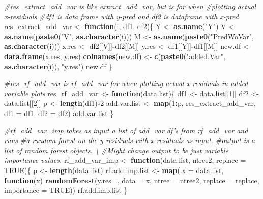 \documentclass[12pt,twoside]{reedthesis}
\newenvironment{Shaded}{\begin{snugshade}}{\end{snugshade}}
\newcommand{\KeywordTok}[1]{\textcolor[rgb]{0.13,0.29,0.53}{\textbf{#1}}}
\newcommand{\DataTypeTok}[1]{\textcolor[rgb]{0.13,0.29,0.53}{#1}}
\newcommand{\DecValTok}[1]{\textcolor[rgb]{0.00,0.00,0.81}{#1}}
\newcommand{\StringTok}[1]{\textcolor[rgb]{0.31,0.60,0.02}{#1}}
\newcommand{\CommentTok}[1]{\textcolor[rgb]{0.56,0.35,0.01}{\textit{#1}}}
\newcommand{\OtherTok}[1]{\textcolor[rgb]{0.56,0.35,0.01}{#1}}
\newcommand{\ControlFlowTok}[1]{\textcolor[rgb]{0.13,0.29,0.53}{\textbf{#1}}}
\newcommand{\OperatorTok}[1]{\textcolor[rgb]{0.81,0.36,0.00}{\textbf{#1}}}
\newcommand{\NormalTok}[1]{#1}
\theoremstyle{definition}
\theoremstyle{definition}
\theoremstyle{definition}
\theoremstyle{remark}
\begin{document}
\begin{Shaded}
\begin{Highlighting}[]
\CommentTok{#res_extract_add_var is like extract_add_var, but is for when }
\CommentTok{#plotting actual x-residuals}
\CommentTok{#df1 is data frame with y-pred and df2 is dataframe with x-pred}
\NormalTok{res_extract_add_var <-}\StringTok{ }\ControlFlowTok{function}\NormalTok{(i, df1, df2)\{}
\NormalTok{  Y <-}\StringTok{ }\KeywordTok{as.name}\NormalTok{(}\StringTok{"Y"}\NormalTok{)}
\NormalTok{  V <-}\StringTok{ }\KeywordTok{as.name}\NormalTok{(}\KeywordTok{paste0}\NormalTok{(}\StringTok{"V"}\NormalTok{, }\KeywordTok{as.character}\NormalTok{(i)))}
\NormalTok{  M <-}\StringTok{ }\KeywordTok{as.name}\NormalTok{(}\KeywordTok{paste0}\NormalTok{(}\StringTok{"PredWoVar"}\NormalTok{, }\KeywordTok{as.character}\NormalTok{(i)))}
\NormalTok{  x.res <-}\StringTok{ }\NormalTok{df2[[V]]}\OperatorTok{-}\NormalTok{df2[[M]]}
\NormalTok{  y.res <-}\StringTok{ }\NormalTok{df1[[Y]]}\OperatorTok{-}\NormalTok{df1[[M]]}
\NormalTok{  new.df <-}\StringTok{ }\KeywordTok{data.frame}\NormalTok{(x.res, y.res)}
  \KeywordTok{colnames}\NormalTok{(new.df) <-}\StringTok{ }\KeywordTok{c}\NormalTok{(}\KeywordTok{paste0}\NormalTok{(}\StringTok{"added.Var"}\NormalTok{, }\KeywordTok{as.character}\NormalTok{(i)), }\StringTok{"y.res"}\NormalTok{)}
\NormalTok{  new.df}
\NormalTok{\}}

\CommentTok{#res_rf_add_var is rf_add_var for when plotting actual x-residuals in added variable plots}
\NormalTok{res_rf_add_var <-}\StringTok{ }\ControlFlowTok{function}\NormalTok{(data.list)\{}
\NormalTok{ df1 <-}\StringTok{ }\NormalTok{data.list[[}\DecValTok{1}\NormalTok{]]}
\NormalTok{ df2 <-}\StringTok{ }\NormalTok{data.list[[}\DecValTok{2}\NormalTok{]]}
\NormalTok{ p <-}\StringTok{ }\KeywordTok{length}\NormalTok{(df1)}\OperatorTok{-}\DecValTok{2}
\NormalTok{ add.var.list <-}\StringTok{ }\KeywordTok{map}\NormalTok{(}\DecValTok{1}\OperatorTok{:}\NormalTok{p, res_extract_add_var, }\DataTypeTok{df1 =}\NormalTok{ df1, }\DataTypeTok{df2 =}\NormalTok{ df2)}
\NormalTok{ add.var.list}
\NormalTok{\}}

\CommentTok{#rf_add_var_imp takes as input a list of add_var df's from rf_add_var and runs}
\CommentTok{#a random forest on the y-residuals with x-residuals as input.}
\CommentTok{#output is a list of random forest objects. \textbackslash{}}
\CommentTok{#Might change output to be just variable importance values. }
\NormalTok{rf_add_var_imp <-}\StringTok{ }\ControlFlowTok{function}\NormalTok{(data.list, ntree2, }\DataTypeTok{replace =} \OtherTok{TRUE}\NormalTok{)\{}
\NormalTok{  p <-}\StringTok{ }\KeywordTok{length}\NormalTok{(data.list)}
\NormalTok{  rf.add.imp.list <-}\StringTok{ }\KeywordTok{map}\NormalTok{(}\DataTypeTok{.x =}\NormalTok{ data.list, }\ControlFlowTok{function}\NormalTok{(x) }
    \KeywordTok{randomForest}\NormalTok{(y.res}\OperatorTok{~}\NormalTok{., }\DataTypeTok{data =}\NormalTok{ x, }\DataTypeTok{ntree =}\NormalTok{ ntree2, }\DataTypeTok{replace =}\NormalTok{ replace, }\DataTypeTok{importance =} \OtherTok{TRUE}\NormalTok{))}
\NormalTok{  rf.add.imp.list}
\NormalTok{\}}


\end{Highlighting}
\end{Shaded}
\end{document}
